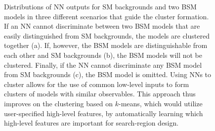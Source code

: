 \documentclass[letter, USenglish, 11pt, subfigure]{article}
\begin{document}
\begin{figure}[!htbp]
  \centering
  \hspace{3mm}
  \hspace{3mm}
  \caption{Distributions of NN outputs for SM backgrounds and two BSM models in three different scenarios that guide the cluster formation. If an NN cannot discriminate between two BSM models that are easily distinguished from SM backgrounds, the models are clustered together (a). If, however, the BSM models are distinguishable from each other and SM backgrounds (b), the BSM models will not be clustered. Finally, if the NN cannot discriminate any BSM model from SM backgrounds (c), the BSM model is omitted. Using NNs to cluster allows for the use of common low-level inputs to form clusters of models with similar observables. This approach thus improves on the clustering based on $k$-means, which would utilize user-specified high-level features, by automatically learning which high-level features are important for search-region design.}
  \label{fig:nnClustering}
\end{figure}
\end{document}
